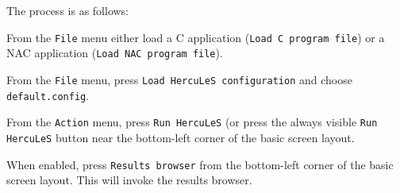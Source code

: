 \documentclass[a4paper]{article}
\begin{document}
The process is as follows:
\setcounter{listcnt0}{0}
\begin{list}{.}
{
\setlength{\rightmargin}{\leftmargin}
}

\item From the \texttt{File} menu either load a C application (\texttt{Load C program file}) or a NAC application (\texttt{Load NAC program file}).

\item From the \texttt{File} menu, press \texttt{Load HercuLeS configuration} and choose \texttt{default.config}.

\item From the \texttt{Action} menu, press \texttt{Run HercuLeS} (or press the always visible \texttt{Run HercuLeS} button near the bottom-left corner of the basic screen layout.

\item When enabled, press \texttt{Results browser} from the bottom-left corner of the basic screen layout. This will invoke the results browser.
\end{list}
\end{document}

